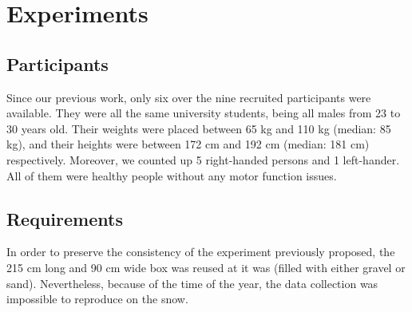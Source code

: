 \documentclass[10pt,conference]{IEEEtran}
\begin{document}
\section{Experiments}

\subsection{Participants}
Since our previous work, only six over the nine recruited participants were available. They were all the same university students, being all males from 23 to 30 years old. Their weights were placed between 65 kg and 110 kg (median: 85 kg), and their heights were between 172 cm and 192 cm (median: 181 cm) respectively. Moreover, we counted up 5 right-handed persons and 1 left-hander. All of them were healthy people without any motor function issues.

\subsection{Requirements}
In order to preserve the consistency of the experiment previously proposed, the 215 cm long and 90 cm wide box was reused at it was (filled with either gravel or sand). Nevertheless, because of the time of the year, the data collection was impossible to reproduce on the snow.


\end{document}
